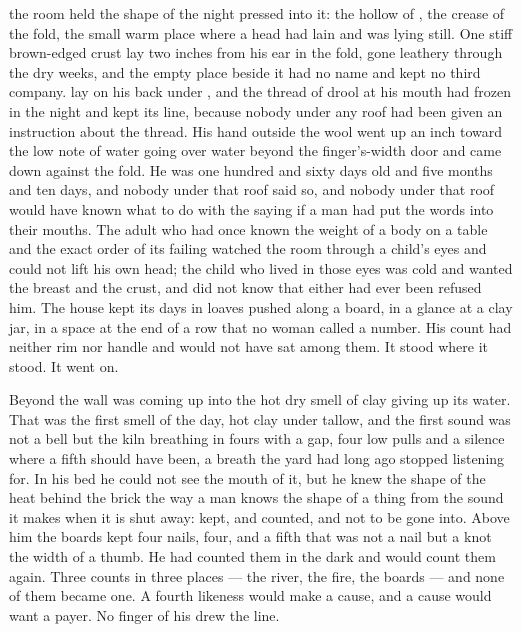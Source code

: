 
 the room held the shape of the night pressed into it: the hollow of , the crease of the fold, the small warm place where a head had lain and was lying still. One stiff brown-edged crust lay two inches from his ear in the fold, gone leathery through the dry weeks, and the empty place beside it had no name and kept no third company.  lay on his back under , and the thread of drool at his mouth had frozen in the night and kept its line, because nobody under any roof had been given an instruction about the thread. His hand outside the wool went up an inch toward the low note of water going over water beyond the finger's-width door and came down against the fold. He was one hundred and sixty days old and five months and ten days, and nobody under that roof said so, and nobody under that roof would have known what to do with the saying if a man had put the words into their mouths. The adult who had once known the weight of a body on a table and the exact order of its failing watched the room through a child's eyes and could not lift his own head; the child who lived in those eyes was cold and wanted the breast and the crust, and did not know that either had ever been refused him. The house kept its days in loaves pushed along a board, in a glance at a clay jar, in a space at the end of a row that no woman called a number. His count had neither rim nor handle and would not have sat among them. It stood where it stood. It went on.

Beyond the wall  was coming up into the hot dry smell of clay giving up its water. That was the first smell of the day, hot clay under tallow, and the first sound was not a bell but the kiln breathing in fours with a gap, four low pulls and a silence where a fifth should have been, a breath the yard had long ago stopped listening for. In his bed he could not see the mouth of it, but he knew the shape of the heat behind the brick the way a man knows the shape of a thing from the sound it makes when it is shut away: kept, and counted, and not to be gone into. Above him the boards kept four nails, four, and a fifth that was not a nail but a knot the width of a thumb. He had counted them in the dark and would count them again. Three counts in three places --- the river, the fire, the boards --- and none of them became one. A fourth likeness would make a cause, and a cause would want a payer. No finger of his drew the line.

